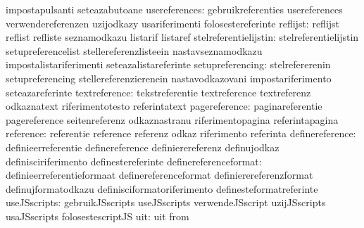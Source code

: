                                   impostapulsanti                  seteazabutoane
                   usereferences: gebruikreferenties               usereferences
                                  verwendereferenzen               uzijodkazy
                                  usariferimenti                   folosestereferinte
                        reflijst: reflijst                         reflist
                                  refliste                         seznamodkazu
                                  listarif                         listaref
           stelreferentielijstin: stelreferentielijstin            setupreferencelist
                                  stellereferenzlisteein           nastavseznamodkazu
                                  impostalistariferimenti          seteazalistareferinte
                setupreferencing: stelrefererenin                  setupreferencing
                                  stellereferenzierenein           nastavodkazovani
                                  impostariferimento               seteazareferinte
                   textreference: tekstreferentie                  textreference
                                  textreferenz                     odkaznatext
                                  riferimentotesto                 referintatext
                   pagereference: paginareferentie                 pagereference
                                  seitenreferenz                   odkaznastranu
                                  riferimentopagina                referintapagina
                       reference: referentie                       reference
                                  referenz                         odkaz
                                  riferimento                      referinta
                 definereference: definieerreferentie              definereference
                                  definierereferenz                definujodkaz
                                  definisciriferimento             definestereferinte
           definereferenceformat: definieerreferentieformaat       definereferenceformat
                                  definierereferenzformat          definujformatodkazu
                                  definisciformatoriferimento      definesteformatreferinte
                    useJSscripts: gebruikJSscripts                 useJSscripts
                                  verwendeJSscript                 uzijJSscripts
                                  usaJSscripts                     folosestescriptJS
                             uit: uit                              from

